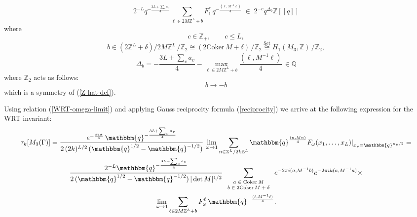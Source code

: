 \documentclass[hyper,letterpaper]{JHEP3}
\newcommand{\Z}{{\mathbb Z}}
\newcommand{\Q}{{\mathbb Q}}
\def\q{{\mathbbm{q}}}
\begin{document}
{\begin{equation}
2^{-L} q^{-\frac{3L+\sum_v a_{v}}{4}}
\sum_{\ell \in 2M\Z^L+b}F^\ell_1\,q^{-\frac{(\ell,M^{-1}\ell)}{4}}
\;\in\; 2^{-c}q^{\Delta_b}\Z[[q]]
\label{Z-hat-def}
\end{equation}
where
\begin{equation}
 c\in \Z_+,\qquad c\leq L,
\end{equation}
\begin{equation}
  b\in (2\Z^L+\delta)/2M\Z^L\,/\Z_2 \cong (2\text{Coker}\,M+\delta)\,/\Z_2
\stackrel{\text{Set}}{\cong} H_1(M_3,\Z)\,/\Z_2,
\end{equation}
\begin{equation}
 \Delta_b=-\frac{3L+\sum_v a_{v}}{4}-\max_{\ell \in 2M\Z^L+b}\frac{(\ell,M^{-1}\ell)}{4}\,\in \Q
\end{equation}
where $\Z_2$ acts as follows:
\begin{equation}
 b\rightarrow -b
\end{equation}
which is a symmetry of (\ref{Z-hat-def}).


Using relation (\ref{WRT-omega-limit}) and applying Gauss reciprocity formula (\ref{reciprocity}) we arrive at the following expression for the WRT invariant:
\begin{multline}
 \tau_k[M_3(\Gamma)]=\frac{e^{-\frac{\pi i\sigma}{4}}\,\q^{-\frac{3L+\sum_v a_{v}}{4}}}{2\,(2k)^{L/2}\,(\q^{1/2}-\q^{-1/2})}\,
\lim_{\omega\rightarrow 1}\sum_{{n}\in \Z^L/2k\Z^L}
  \q^{\frac{(n,Mn)}{4}}
 F_\omega(x_1,\ldots,x_L)|_{x_v=\q^{n_v/2}}
\label{WRT-Gamma-2}=\\
\frac{2^{-L} \q^{-\frac{3L+\sum_v a_{v}}{4}}}{2\,(\q^{1/2}-\q^{-1/2})\,|\det M|^{1/2}}
\sum_{\scriptsize\begin{array}{c}a\in \mathrm{Coker}\,M \\ b \in 2\mathrm{Coker}\, M+\delta \end{array}}
 e^{-2\pi i(a,M^{-1}b)} e^{-2\pi ik(a,M^{-1}a)}\times\\
\lim_{\omega\rightarrow 1}
\sum_{\ell \in 2M\Z^L+b}F^\ell_\omega\,\q^{-\frac{(\ell,M^{-1}\ell)}{4}}.
\end{multline}

}
\end{document}

